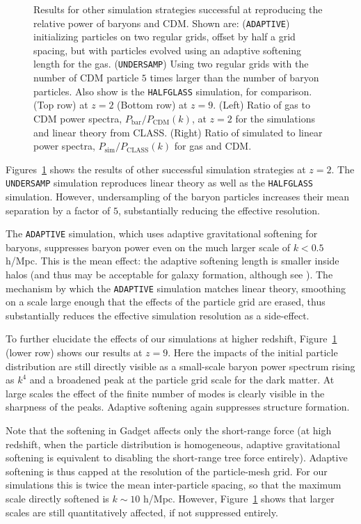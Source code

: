 \documentclass[a4paper,11pt]{article}
\begin{document}
\begin{figure}
\caption{Results for other simulation strategies successful at reproducing the relative power of baryons and CDM. Shown are: (\texttt{ADAPTIVE}) initializing particles on two regular grids, offset by half a grid spacing, but with particles evolved using an adaptive softening length for the gas. (\texttt{UNDERSAMP}) Using two regular grids with the number of CDM particle $5$ times larger than the number of baryon particles. Also show is the \texttt{HALFGLASS} simulation, for comparison. (Top row) at $z=2$ (Bottom row) at $z=9$. (Left) Ratio of gas to CDM power spectra, $P_\mathrm{bar}/P_\mathrm{CDM}(k)$, at $z=2$ for the simulations and linear theory from CLASS. (Right) Ratio of simulated to linear power spectra, $P_\mathrm{sim}/P_\mathrm{CLASS}(k)$ for gas and CDM.}
  \label{fig:adaptive}
\end{figure}

Figures~\ref{fig:adaptive} shows the results of other successful simulation strategies at $z=2$. The \texttt{UNDERSAMP} simulation reproduces linear theory as well as the \texttt{HALFGLASS} simulation. However, undersampling of the baryon particles increases their mean separation by a factor of $5$, substantially reducing the effective resolution.

The \texttt{ADAPTIVE} simulation, which uses adaptive gravitational softening for baryons, suppresses baryon power even on the much larger scale of $k < 0.5$ h/Mpc.
This is the mean effect: the adaptive softening length is smaller inside halos (and thus may be acceptable for galaxy formation, although see \cite{Fvdb:2018}). The mechanism by which the \texttt{ADAPTIVE} simulation matches linear theory, smoothing on a scale large enough that the effects of the particle grid are erased, thus substantially reduces the effective simulation resolution as a side-effect.

To further elucidate the effects of our simulations at higher redshift, Figure~\ref{fig:adaptive} (lower row) shows our results at $z=9$. Here the impacts of the initial particle distribution are still directly visible as a small-scale baryon power spectrum rising as $k^4$ and a broadened peak at the particle grid scale for the dark matter. At large scales the effect of the finite number of modes is clearly visible in the sharpness of the peaks. Adaptive softening again suppresses structure formation.

Note that the softening in Gadget affects only the short-range force (at high redshift, when the particle distribution is homogeneous, adaptive gravitational softening is equivalent to disabling the short-range tree force entirely). Adaptive softening is thus capped at the resolution of the particle-mesh grid. For our simulations this is twice the mean inter-particle spacing, so that the maximum scale directly softened is $k \sim 10$ h/Mpc. However, Figure~\ref{fig:adaptive} shows that larger scales are still quantitatively affected, if not suppressed entirely.
\end{document}
